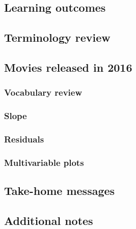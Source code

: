 \documentclass[
]{report}
\begin{document}
\hypertarget{learning-outcomes-7}{%
\subsection{Learning outcomes}\label{learning-outcomes-7}}

\hypertarget{terminology-review-7}{%
\subsection{Terminology review}\label{terminology-review-7}}

\hypertarget{movies-released-in-2016-1}{%
\subsection{Movies released in 2016}\label{movies-released-in-2016-1}}

\hypertarget{vocabulary-review}{%
\subsubsection*{Vocabulary review}\label{vocabulary-review}}

\hypertarget{slope}{%
\subsubsection*{Slope}\label{slope}}

\hypertarget{residuals}{%
\subsubsection*{Residuals}\label{residuals}}

\hypertarget{multivariable-plots-1}{%
\subsubsection*{Multivariable plots}\label{multivariable-plots-1}}

\hypertarget{take-home-messages-7}{%
\subsection{Take-home messages}\label{take-home-messages-7}}

\hypertarget{additional-notes-6}{%
\subsection{Additional notes}\label{additional-notes-6}}
\end{document}
